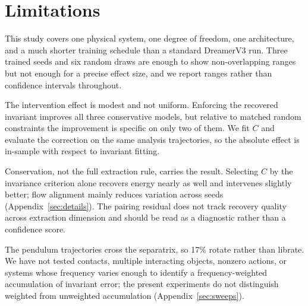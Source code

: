 \section{Limitations}
\label{sec:limits}

This study covers one physical system, one degree of freedom, one architecture, and a much shorter
training schedule than a standard DreamerV3 run. Three trained seeds and six random draws are enough
to show non-overlapping ranges but not enough for a precise effect size, and we report ranges rather
than confidence intervals throughout.

The intervention effect is modest and not uniform. Enforcing the recovered invariant improves all
three conservative models, but relative to matched random constraints the improvement is specific on
only two of them. We fit $C$ and evaluate the correction on the same analysis trajectories, so the
absolute effect is in-sample with respect to invariant fitting.

Conservation, not the full extraction rule, carries the result. Selecting $C$ by the invariance
criterion alone recovers energy nearly as well and intervenes slightly better; flow alignment mainly
reduces variation across seeds (Appendix~\ref{sec:details}). The pairing residual does not track
recovery quality across extraction dimension and should be read as a diagnostic rather than a
confidence score.

The pendulum trajectories cross the separatrix, so 17\% rotate rather than librate. We have not
tested contacts, multiple interacting objects, nonzero actions, or systems whose frequency varies
enough to identify a frequency-weighted accumulation of invariant error; the present experiments do
not distinguish weighted from unweighted accumulation (Appendix~\ref{sec:sweeps}).
